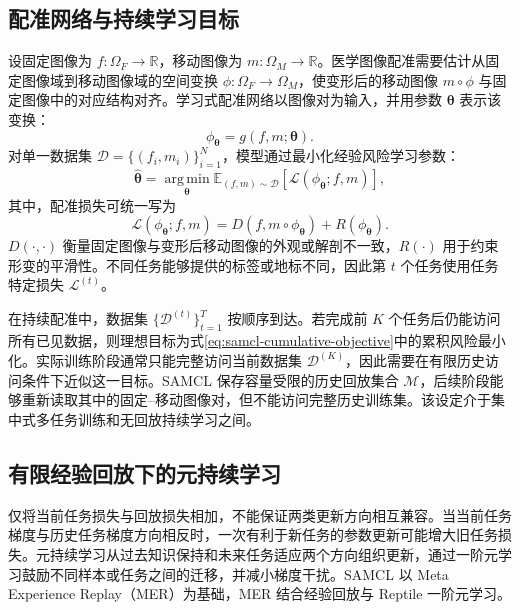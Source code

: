 \subsection{配准网络与持续学习目标}
\label{subsec:samcl-registration-objective}

设固定图像为 $f:\Omega_F\rightarrow\mathbb{R}$，移动图像为 $m:\Omega_M\rightarrow\mathbb{R}$。医学图像配准需要估计从固定图像域到移动图像域的空间变换
$\phi:\Omega_F\rightarrow\Omega_M$，使变形后的移动图像
$m\circ\phi$ 与固定图像中的对应结构对齐。学习式配准网络以图像对为输入，并用参数 $\boldsymbol{\theta}$ 表示该变换：
\begin{equation}
\phi_{\boldsymbol{\theta}}
=
g(f,m;\boldsymbol{\theta}).
\label{eq:samcl-registration-network}
\end{equation}
对单一数据集 $\mathcal{D}=\{(f_i,m_i)\}_{i=1}^{N}$，模型通过最小化经验风险学习参数：
\begin{equation}
\widehat{\boldsymbol{\theta}}
=
\operatorname*{arg\,min}_{\boldsymbol{\theta}}
\mathbb{E}_{(f,m)\sim\mathcal{D}}
\left[
\mathcal{L}(\phi_{\boldsymbol{\theta}};f,m)
\right],
\label{eq:samcl-single-task-objective}
\end{equation}
其中，配准损失可统一写为
\begin{equation}
\mathcal{L}(\phi_{\boldsymbol{\theta}};f,m)
=
D\!\left(f,m\circ\phi_{\boldsymbol{\theta}}\right)
+
R\!\left(\phi_{\boldsymbol{\theta}}\right).
\label{eq:samcl-registration-loss}
\end{equation}
$D(\cdot,\cdot)$ 衡量固定图像与变形后移动图像的外观或解剖不一致，$R(\cdot)$ 用于约束形变的平滑性。不同任务能够提供的标签或地标不同，因此第 $t$ 个任务使用任务特定损失 $\mathcal{L}^{(t)}$。

在持续配准中，数据集
$\{\mathcal{D}^{(t)}\}_{t=1}^{T}$ 按顺序到达。若完成前 $K$ 个任务后仍能访问所有已见数据，则理想目标为式\eqref{eq:samcl-cumulative-objective}中的累积风险最小化。实际训练阶段通常只能完整访问当前数据集 $\mathcal{D}^{(K)}$，因此需要在有限历史访问条件下近似这一目标。SAMCL 保存容量受限的历史回放集合 $\mathcal{M}$，后续阶段能够重新读取其中的固定--移动图像对，但不能访问完整历史训练集。该设定介于集中式多任务训练和无回放持续学习之间。

\subsection{有限经验回放下的元持续学习}
\label{subsec:samcl-meta-continual}

仅将当前任务损失与回放损失相加，不能保证两类更新方向相互兼容。当当前任务梯度与历史任务梯度方向相反时，一次有利于新任务的参数更新可能增大旧任务损失。元持续学习从过去知识保持和未来任务适应两个方向组织更新，通过一阶元学习鼓励不同样本或任务之间的迁移，并减小梯度干扰。SAMCL 以 Meta Experience Replay（MER）为基础，MER 结合经验回放与 Reptile 一阶元学习\cite{riemer2019mer,nichol2018firstorder,method_replay_er}。

